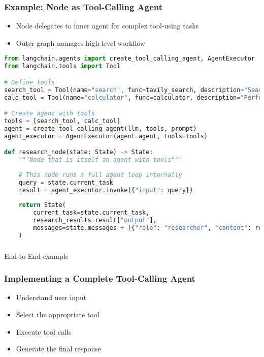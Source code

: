\begin{frame}[fragile]\frametitle{Example: Node as Tool-Calling Agent}

      \begin{itemize}
        \item Node delegates to inner agent for complex tool-using tasks
        \item Outer graph manages high-level workflow
      \end{itemize}
	  
      \begin{lstlisting}[language=Python, basicstyle=\tiny]
from langchain.agents import create_tool_calling_agent, AgentExecutor
from langchain.tools import Tool

# Define tools
search_tool = Tool(name="search", func=tavily_search, description="Search the web")
calc_tool = Tool(name="calculator", func=calculator, description="Perform calculations")

# Create agent with tools
tools = [search_tool, calc_tool]
agent = create_tool_calling_agent(llm, tools, prompt)
agent_executor = AgentExecutor(agent=agent, tools=tools)

def research_node(state: State) -> State:
    """Node that is itself an agent with tools"""
    
    # This node runs a full agent loop internally
    query = state.current_task
    result = agent_executor.invoke({"input": query})
    
    return State(
        current_task=state.current_task,
        research_results=result["output"],
        messages=state.messages + [{"role": "researcher", "content": result["output"]}]
    )
      \end{lstlisting}
     
\end{frame}


\begin{frame}[fragile]\frametitle{}
\begin{center}
{\Large End-to-End example}
\end{center}
\end{frame}

\begin{frame}[fragile]\frametitle{Implementing a Complete Tool-Calling Agent}
      \begin{itemize}
        \item Understand user input
        \item Select the appropriate tool
        \item Execute tool calls
        \item Generate the final response
      \end{itemize}
\end{frame}


